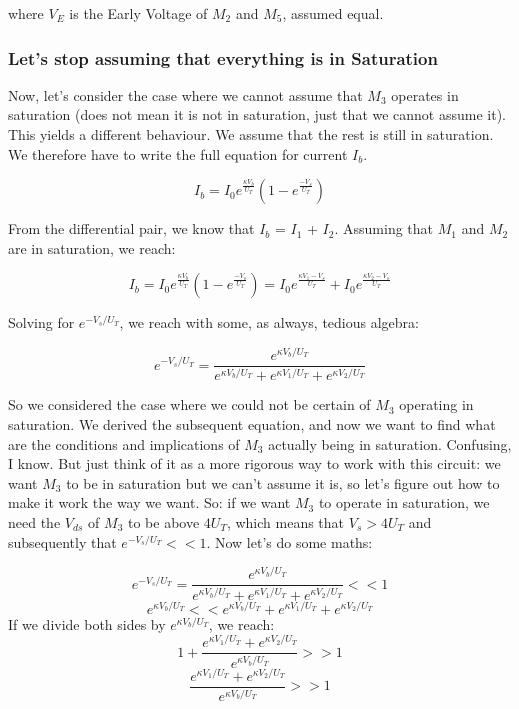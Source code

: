 where $V_E$ is the Early Voltage of $M_2$ and $M_5$, assumed equal. 

\subsubsection{Let's stop assuming that everything is in Saturation}

Now, let's consider the case where we cannot assume that $M_3$ operates in saturation (does not mean it is not in saturation, just that we cannot assume it). This yields a different behaviour. We assume that the rest is still in saturation. We therefore have to write the full equation for current $I_b$.

\begin{equation}
    I_b = I_0 e^{\frac{\kappa V_b}{U_T}}(1 - e^{\frac{-V_s}{U_T}})
\end{equation}

From the differential pair, we know that $I_b$ = $I_1$ + $I_2$. Assuming that $M_1$ and $M_2$ are in saturation, we reach: 

\begin{equation}
    I_b = I_0 e^{\frac{\kappa V_b}{U_T}}(1 - e^{\frac{-V_s}{U_T}}) = I_0e^{\frac{\kappa V_1 - V_s}{U_T}} + I_0e^{\frac{\kappa V_2 - V_s}{U_T}}
\end{equation}

Solving for $e^{-V_s/U_T}$, we reach with some, as always, tedious algebra: 

\begin{equation}
    e^{-V_s/U_T} = \frac{e^{\kappa V_b/U_T}}{e^{\kappa V_b/U_T} + e^{\kappa V_1/U_T} + e^{\kappa V_2/U_T}}
\end{equation}

So we considered the case where we could not be certain of $M_3$ operating in saturation. We derived the subsequent equation, and now we want to find what are the conditions and implications of $M_3$ actually being in saturation. Confusing, I know. But just think of it as a more rigorous way to work with this circuit: we want $M_3$ to be in saturation but we can't assume it is, so let's figure out how to make it work the way we want. So: if we want $M_3$ to operate in saturation, we need the $V_{ds}$ of $M_3$ to be above $4 U_T$, which means that $V_s > 4U_T$  and subsequently that $e^{-V_s/U_T} << 1$. Now let's do some maths: 

\begin{equation}
    e^{-V_s/U_T} = \frac{e^{\kappa V_b/U_T}}{e^{\kappa V_b/U_T} + e^{\kappa V_1/U_T} + e^{\kappa V_2/U_T}} << 1
\end{equation}
\begin{equation}
    e^{\kappa V_b/U_T} << e^{\kappa V_b/U_T} + e^{\kappa V_1/U_T} + e^{\kappa V_2/U_T}
\end{equation}
If we divide both sides by $e^{\kappa V_b/U_T}$, we reach: 
\begin{equation}
    1 + \frac{e^{\kappa V_1/U_T} + e^{\kappa V_2/U_T}}{e^{\kappa V_b/U_T}} >> 1
\end{equation}
\begin{equation}
    \frac{e^{\kappa V_1/U_T} + e^{\kappa V_2/U_T}}{e^{\kappa V_b/U_T}} >> 1
\end{equation}

